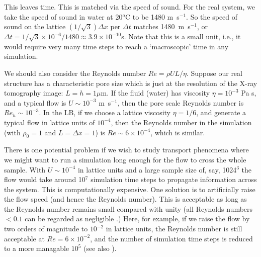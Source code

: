 This leaves time. This is matched via the speed of sound. For the real
system, we take the speed of sound in water at 20$^o$C to be
1480 m~s$^{-1}$. So the speed of sound on the lattice
$(1/\sqrt{3}) \Delta x$ per $\Delta t$ matches 1480~m~s$^{-1}$,
or $\Delta t = 1/\sqrt{3} \times 10^{-6} / 1480 \approx 3.9 \times 10^{-10}$s.
Note that this is a small unit, i.e., it would require very many time
steps to reach a `macroscopic' time in any simulation.

We should also consider the Reynolds number $Re = \rho U L / \eta$.
Suppose our real structure has a characteristic pore size which is
just at the resolution of the X-ray tomography image: $L = h = 1\mu$m.
If the fluid (water) has viscosity $\eta = 10^{-3}$ Pa s, and
a typical flow is $U \sim 10^{-3}$ m~s$^{-1}$, then the pore scale
Reynolds number is $Re_h \sim 10^{-3}$. In the LB, if we choose a
lattice viscosity $\eta = 1/6$, and generate a typical flow in
lattice units of $10^{-4}$, then the Reynolds number in the
simulation (with $\rho_0 = 1$ and $L = \Delta x = 1$) is
$Re \sim 6 \times 10^{-4}$, which is similar.


There is one potential problem if we wish to study transport
phenomena where we might want to run a simulation long enough
for the flow to cross the whole sample. With $U \sim 10^{-4}$
in lattice units and a large sample size of, say,  1024$^3$ the
flow would take around 10$^7$ simulation time steps to propagate
information across the system. This is computationally expensive.
One solution is
to artificially raise the flow speed (and hence the Reynolds
number). This is acceptable as long as the Reynolds number
remains small compared with unity (all Reynolds numbers $< 0.1$
can be regarded as negligible \cite{batchelor}.) Here, for example,
if we raise the flow by two orders of magnitude to $10^{-2}$ in
lattice units,
the Reynolds number is still acceptable at $Re = 6\times 10^{-2}$,
and the number of simulation time steps is reduced to a more
managable $10^5$ (see also \cite{cates_scaling}).


\vfill
\pagebreak

